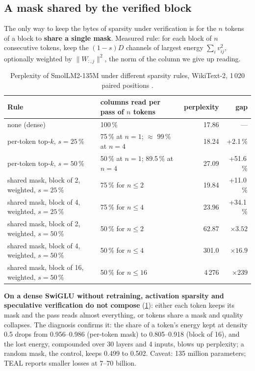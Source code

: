 \subsection{A mask shared by the verified block}

The only way to keep the bytes of sparsity under verification is for the $n$ tokens of a block to \textbf{share a single mask}. Measured rule: for each block of $n$ consecutive tokens, keep the $(1-s)D$ channels of largest energy $\sum_i v_{ij}^2$, optionally weighted by $\lVert W_{:,j} \rVert^2$, the norm of the column we give up reading.

\begin{table}[ht]
\centering\small
\caption[The quality cost of a shared mask]{Perplexity of SmolLM2-135M under different sparsity rules, WikiText-2, 1\,020 paired positions \mes.}
\label{tab:masque-commun}
\begin{tabular}{@{}llrr@{}}
\toprule
Rule & columns read per pass of $n$ tokens & perplexity & gap \\
\midrule
none (dense) & 100\,\% & 17.86 & --- \\
per-token top-$k$, $s = 25$\,\% & 75\,\% at $n=1$; $\approx$ 99\,\% at $n=4$ & 18.24 & +2.1\,\% \\
per-token top-$k$, $s = 50$\,\% & 50\,\% at $n=1$; 89.5\,\% at $n=4$ & 27.09 & +51.6\,\% \\
shared mask, block of 2, weighted, $s = 25$\,\% & 75\,\% for $n \le 2$ & 19.84 & +11.0\,\% \\
shared mask, block of 4, weighted, $s = 25$\,\% & 75\,\% for $n \le 4$ & 23.96 & +34.1\,\% \\
shared mask, block of 2, weighted, $s = 50$\,\% & 50\,\% for $n \le 2$ & 62.87 & $\times3.52$ \\
shared mask, block of 4, weighted, $s = 50$\,\% & 50\,\% for $n \le 4$ & 301.0 & $\times16.9$ \\
shared mask, block of 16, weighted, $s = 50$\,\% & 50\,\% for $n \le 16$ & 4\,276 & $\times239$ \\
\bottomrule
\end{tabular}
\end{table}

\textbf{On a dense SwiGLU without retraining, activation sparsity and speculative verification do not compose} (\cref{tab:masque-commun}): either each token keeps its mask and the pass reads almost everything, or tokens share a mask and quality collapses. The diagnosis confirms it: the share of a token's energy kept at density 0.5 drops from 0.956--0.986 (per-token mask) to 0.805--0.918 (block of 16), and the lost energy, compounded over 30 layers and 4 inputs, blows up perplexity; a random mask, the control, keeps 0.499 to 0.502. Caveat: 135 million parameters; TEAL reports smaller losses at 7--70 billion.

